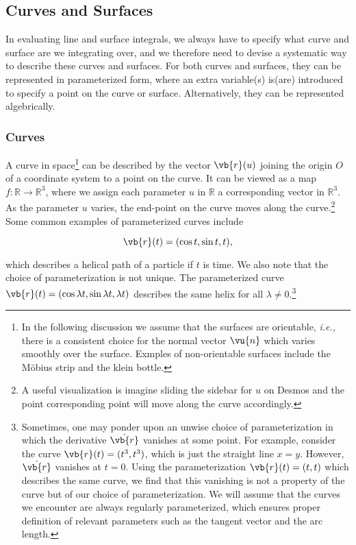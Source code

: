 \documentclass[english,a4paper,12pt]{report}
\begin{document}
\subsection{Curves and Surfaces}

In evaluating line and surface integrals, we always have to specify what curve and surface are we integrating over, and we therefore need to devise a systematic way to describe these curves and surfaces. For both curves and surfaces, they can be represented in parameterized form, where an extra variable(s) is(are) introduced to specify a point on the curve or surface. Alternatively, they can be represented algebrically.

\subsubsection{Curves}

A curve in space\footnote{In the following discussion we assume that the surfaces are orientable, \textit{i.e.,} there is a consistent choice for the normal vector \(\vu{n} \) which varies smoothly over the surface. Exmples of non-orientable surfaces include the Möbius strip and the klein bottle.} can be described by the vector \(\vb{r} (u)\) joining the origin \(O\) of a coordinate system to a point on the curve. It can be viewed as a map\(f: \mathbb{R} \to \mathbb{R}^{3} \), where we assign each parameter \(u\) in \(\mathbb{R}\) a corresponding vector in \(\mathbb{R}^{3} \).  As the parameter \(u\) varies, the end-point on the curve moves along the curve.\footnote{A useful visualization is imagine sliding the sidebar for \(u\) on Desmos and the point corresponding point will move along the curve accordingly.} Some common examples of parameterized curves include

\begin{equation}
	\vb{r} (t) = (\cos t, \sin t, t), 
\end{equation}

which describes a helical path of a particle if \(t\) is time. We also note that the choice of parameterization is not unique. The parameterized curve \(\vb{r} (t) = (\cos \lambda t, \sin \lambda t, \lambda t)\) describes the same helix for all \(\lambda \neq 0\).\footnote{Sometimes, one may ponder upon an unwise choice of parameterization in which the derivative \(\dot{\vb{r} } \) vanishes at some point. For example, consider the curve \(\vb{r} (t) = (t^3 ,t^3 )\), which is just the straight line \(x=y\). However, \(\dot{\vb{r} } \) vanishes at \(t=0\). Using the parameterization \(\vb{r} (t) = (t,t)\) which describes the same curve, we find that this vanishing is not a property of the curve but of our choice of parameterization. We will assume that the curves we encounter are always regularly parameterized, which ensures proper definition of relevant parameters such as the tangent vector and the arc length.}  
\end{document}
